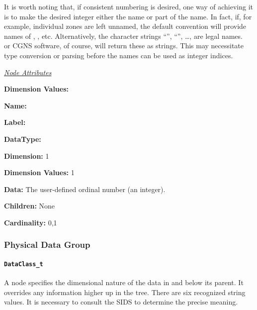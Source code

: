 It is worth noting that, if consistent numbering is desired, one way of
achieving it is to make the desired integer either the name or part of
the name. In fact, if, for example, individual zones are left unnamed,
the default convention will provide names of , ,
etc. Alternatively, the character strings ``'', ``'',
\ldots, are legal names. \SLL~ or CGNS software, of course, will return
these as strings. This may necessitate type conversion or parsing before
the names can be used as integer indices.

\textit{\uline{Node Attributes}}
\begin{Ventryic}{\textbf{Dimension Values:}}
\item [\textbf{Name:}]
\item [\textbf{Label:}]
\item [\textbf{DataType:}]
\item [\textbf{Dimension:}]
      1
\item [\textbf{Dimension Values:}]
      1
\item [\textbf{Data:}]
      The user-defined ordinal number (an integer).
\item [\textbf{Children:}]
      None
\item [\textbf{Cardinality:}]
      0,1
\end{Ventryic}

\subsubsection{Physical Data Group}

\paragraph{\texttt{DataClass\_t}}

A  node specifies the dimensional nature of the
data in and below its parent. It overrides any 
information higher up in the tree. There are six recognized string
values. It is necessary to consult the SIDS to determine the precise
meaning.

